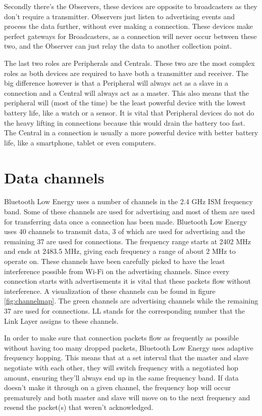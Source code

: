 \documentclass[pdftex,a4paper,12pt,twoside]{report}
\begin{document}
Secondly there's the Observers, these devices are opposite to broadcasters as they don't require a transmitter. Observers just listen to advertising events and process the data further, without ever making a connection. These devices make perfect gateways for Broadcasters, as a connection will never occur between these two, and the Observer can just relay the data to another collection point.

The last two roles are Peripherals and Centrals. These two are the most complex roles as both devices are required to have both a transmitter and receiver. The big difference however is that a Peripheral will always act as a slave in a connection and a Central will always act as a master. This also means that the peripheral will (most of the time) be the least powerful device with the lowest battery life, like a watch or a sensor. It is vital that Peripheral devices do not do the heavy lifting in connections because this would drain the battery too fast. The Central in a connection is usually a more powerful device with better battery life, like a smartphone, tablet or even computers.

\section{Data channels}
\label{sec:channels}
Bluetooth Low Energy uses a number of channels in the 2.4 GHz ISM frequency band. Some of these channels are used for advertising and most of them are used for transferring data once a connection has been made. Bluetooth Low Energy uses 40 channels to transmit data, 3 of which are used for advertising and the remaining 37 are used for connections. The frequency range starts at 2402 MHz and ends at 2483.5 MHz, giving each frequency a range of about 2 MHz to operate on. These channels have been carefully picked to have the least interference possible from Wi-Fi on the advertising channels. Since every connection starts with advertisements it is vital that these packets flow without interference. A visualization of these channels can be found in figure \ref{fig:channelmap}. The green channels are advertising channels while the remaining 37 are used for connections. LL stands for the corresponding number that the Link Layer assigns to these channels.

In order to make sure that connection packets flow as frequently as possible without having too many dropped packets, Bluetooth Low Energy uses adaptive frequency hopping. This means that at a set interval that the master and slave negotiate with each other, they will switch frequency with a negotiated hop amount, ensuring they'll always end up in the same frequency band. If data doesn't make it through on a given channel, the frequency hop will occur prematurely and both master and slave will move on to the next frequency and resend the packet(s) that weren't acknowledged.
\end{document}

